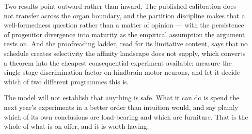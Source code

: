\documentclass[11pt,a4paper]{article}
\theoremstyle{plain}
\theoremstyle{definition}
\theoremstyle{remark}
\begin{document}
Two results point outward rather than inward. The published calibration does
not transfer across the organ boundary, and the partition discipline makes
that a well-formedness question rather than a matter of opinion --- with the
persistence of progenitor divergence into maturity as the empirical assumption
the argument rests on. And the proofreading ladder, read for its limitative
content, says that no schedule creates selectivity the affinity landscape does
not supply, which converts a theorem into the cheapest consequential
experiment available: measure the single-stage discrimination factor on
hindbrain motor neurons, and let it decide which of two different programmes
this is.

The model will not establish that anything is safe. What it can do is spend
the next year's experiments in a better order than intuition would, and say
plainly which of its own conclusions are load-bearing and which are furniture.
That is the whole of what is on offer, and it is worth having.
\end{document}
